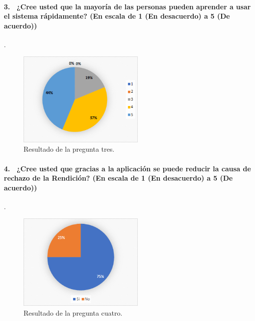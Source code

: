 \paragraph{3.  ¿Cree usted que la mayoría de las personas pueden aprender a usar el sistema rápidamente? (En escala de 1 (En desacuerdo) a 5 (De acuerdo))}.

\begin{figure}[h!]
    \centering
    \includegraphics[width=0.55\textwidth]{Imagenes/Pregunta3.png}
    \caption{\label{fig: Pregunta3}Resultado de la pregunta tres.}
\end{figure}

\paragraph{4.  ¿Cree usted que gracias a la aplicación se puede reducir la causa de rechazo de la Rendición? (En escala de 1 (En desacuerdo) a 5 (De acuerdo))}.

\begin{figure}[h!]
    \centering
    \includegraphics[width=0.55\textwidth]{Imagenes/Pregunta4.png}
    \caption{\label{fig: Pregunta4}Resultado de la pregunta cuatro.}
\end{figure}
